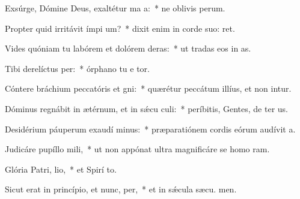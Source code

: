 \item Exsúrge, Dómine Deus, exaltétur ma a:~* ne oblivis perum.
\item Propter quid irritávit ímpi um?~* dixit enim in corde suo:  ret.
\item Vides quóniam tu labórem et dolórem deras:~* ut tradas eos in  as.
\item Tibi derelíctus  per:~* órphano tu e tor.
\item Cóntere bráchium peccatóris et gni:~* quærétur peccátum illíus, et non intur.
\item Dóminus regnábit in ætérnum, et in sǽcu culi:~* períbitis, Gentes, de ter us.
\item Desidérium páuperum exaudí minus:~* præparatiónem cordis eórum audívit  a.
\item Judicáre pupíllo  mili,~* ut non appónat ultra magnificáre se homo  ram.
\item Glória Patri,  lio,~* et Spirí to.
\item Sicut erat in princípio, et nunc,  per,~* et in sǽcula sæcu. men.

